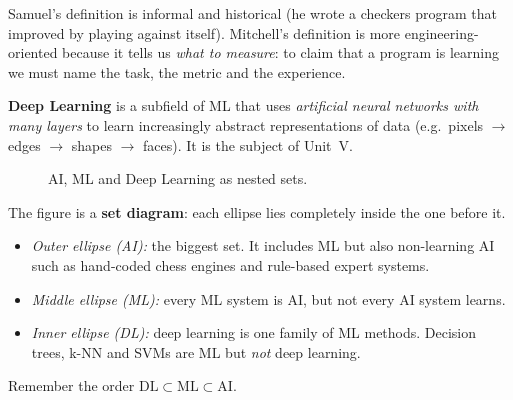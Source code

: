 Samuel's definition is informal and historical (he wrote a checkers program that improved by playing against itself). Mitchell's definition is more engineering-oriented because it tells us \emph{what to measure}: to claim that a program is learning we must name the task, the metric and the experience.

\begin{definition}
\textbf{Deep Learning} is a subfield of ML that uses \emph{artificial neural networks with many layers} to learn increasingly abstract representations of data (e.g.\ pixels $\rightarrow$ edges $\rightarrow$ shapes $\rightarrow$ faces). It is the subject of Unit~V.
\end{definition}

\begin{figure}[!htbp]
\centering
{}
\caption{AI, ML and Deep Learning as nested sets.}\label{fig:venn}
\end{figure}

\begin{explain}
The figure is a \textbf{set diagram}: each ellipse lies completely inside the one before it.
\begin{itemize}
  \item \emph{Outer ellipse (AI):} the biggest set. It includes ML but also non-learning AI such as hand-coded chess engines and rule-based expert systems.
  \item \emph{Middle ellipse (ML):} every ML system is AI, but not every AI system learns.
  \item \emph{Inner ellipse (DL):} deep learning is one family of ML methods. Decision trees, k-NN and SVMs are ML but \emph{not} deep learning.
\end{itemize}
Remember the order $\text{DL} \subset \text{ML} \subset \text{AI}$.
\end{explain}

